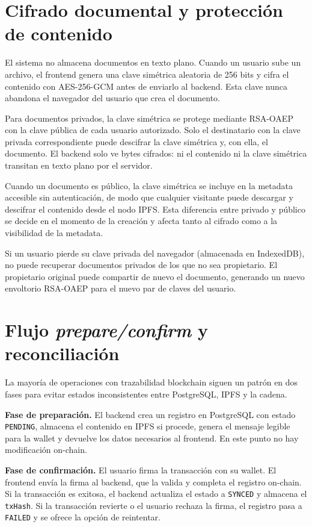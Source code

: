 \documentclass[11pt, a4paper]{article}
\begin{document}
\section{Cifrado documental y protecci\'on de contenido}

El sistema no almacena documentos en texto plano. Cuando un usuario sube un archivo, el frontend genera una clave sim\'etrica aleatoria de 256 bits y cifra el contenido con AES-256-GCM antes de enviarlo al backend. Esta clave nunca abandona el navegador del usuario que crea el documento.

Para documentos privados, la clave sim\'etrica se protege mediante RSA-OAEP con la clave p\'ublica de cada usuario autorizado. Solo el destinatario con la clave privada correspondiente puede descifrar la clave sim\'etrica y, con ella, el documento. El backend solo ve bytes cifrados: ni el contenido ni la clave sim\'etrica transitan en texto plano por el servidor.

Cuando un documento es p\'ublico, la clave sim\'etrica se incluye en la metadata accesible sin autenticaci\'on, de modo que cualquier visitante puede descargar y descifrar el contenido desde el nodo IPFS. Esta diferencia entre privado y p\'ublico se decide en el momento de la creaci\'on y afecta tanto al cifrado como a la visibilidad de la metadata.

Si un usuario pierde su clave privada del navegador (almacenada en IndexedDB), no puede recuperar documentos privados de los que no sea propietario. El propietario original puede compartir de nuevo el documento, generando un nuevo envoltorio RSA-OAEP para el nuevo par de claves del usuario.

\section{Flujo \textit{prepare/confirm} y reconciliaci\'on}

La mayor\'ia de operaciones con trazabilidad blockchain siguen un patr\'on en dos fases para evitar estados inconsistentes entre PostgreSQL, IPFS y la cadena.

\textbf{Fase de preparaci\'on.} El backend crea un registro en PostgreSQL con estado \texttt{PENDING}, almacena el contenido en IPFS si procede, genera el mensaje legible para la wallet y devuelve los datos necesarios al frontend. En este punto no hay modificaci\'on on-chain.

\textbf{Fase de confirmaci\'on.} El usuario firma la transacci\'on con su wallet. El frontend env\'ia la firma al backend, que la valida y completa el registro on-chain. Si la transacci\'on es exitosa, el backend actualiza el estado a \texttt{SYNCED} y almacena el \texttt{txHash}. Si la transacci\'on revierte o el usuario rechaza la firma, el registro pasa a \texttt{FAILED} y se ofrece la opci\'on de reintentar.
\end{document}
